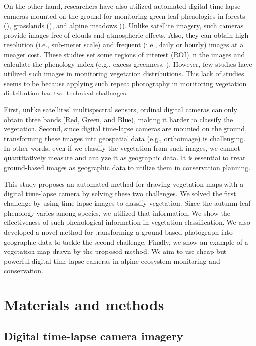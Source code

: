 \documentclass{article}
\begin{document}
On the other hand, researchers have also utilized automated digital time-lapse cameras mounted on the ground for monitoring green-leaf phenologies in forests (\cite{Richardson2009EcolAppl}), grasslands (\cite{Browning2017RemSen}), and alpine meadows (\cite{IdeOguma2013EcolInfom}). Unlike satellite imagery, such cameras provide images free of clouds and atmospheric effects. Also, they can obtain high-resolution (i.e., sub-meter scale) and frequent (i.e., daily or hourly) images at a meager cost. These studies set some regions of interest (ROI) in the images and calculate the phenology index (e.g., excess greenness, \cite{Woebbecke1995ASAE}). However, few studies have utilized such images in monitoring vegetation distributions. This lack of studies seems to be because applying such repeat photography in monitoring vegetation distribution has two technical challenges.

First, unlike satellites' multispectral sensors, ordinal digital cameras can only obtain three bands (Red, Green, and Blue), making it harder to classify the vegetation. Second, since digital time-lapse cameras are mounted on the ground, transforming these images into geospatial data (e.g., orthoimage) is challenging. In other words, even if we classify the vegetation from such images, we cannot quantitatively measure and analyze it as geographic data. It is essential to treat ground-based images as geographic data to utilize them in conservation planning.

This study proposes an automated method for drawing vegetation maps with a digital time-lapse camera by solving these two challenges. We solved the first challenge by using time-lapse images to classify vegetation. Since the autumn leaf phenology varies among species, we utilized that information. We show the effectiveness of such phenological information in vegetation classification. We also developed a novel method for transforming a ground-based photograph into geographic data to tackle the second challenge. Finally, we show an example of a vegetation map drawn by the proposed method. We aim to use cheap but powerful digital time-lapse cameras in alpine ecosystem monitoring and conservation.

\hypertarget{materials-and-methods}{%
\section{Materials and methods}\label{materials-and-methods}}

\hypertarget{digital-time-lapse-camera-imagery}{%
\subsection{Digital time-lapse camera imagery}\label{digital-time-lapse-camera-imagery}}
\end{document}
